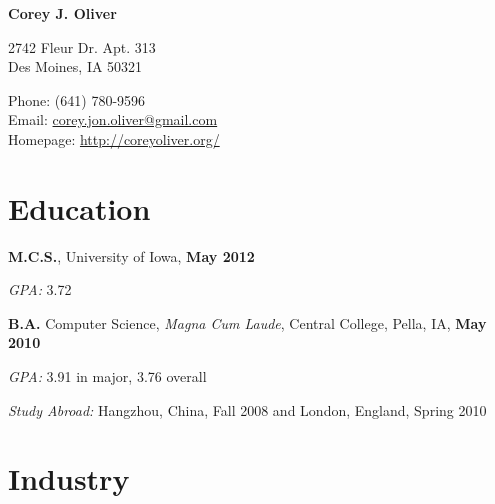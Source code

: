 \documentclass[10pt,letterpaper]{article}
\def\name{Corey J. Oliver}
\renewenvironment{itemize}{
  \begin{list}{}{
      \setlength{\leftmargin}{1.5em}
      \setlength{\itemsep}{0.25em}
      \setlength{\parskip}{0pt}
      \setlength{\parsep}{0.25em}
    }
  }{
  \end{list}
}
\begin{document}

\centerline{\huge \bf \name}

\bigskip

\begin{minipage}[t]{0.5\textwidth}
  2742 Fleur Dr. Apt. 313 \\
  Des Moines, IA 50321
\end{minipage}
\begin{minipage}[t]{0.5\textwidth}
  Phone: (641) 780-9596 \\
  Email: \href{mailto:corey.jon.oliver@gmail.com}{corey.jon.oliver@gmail.com} \\
  Homepage: \href{http://coreyoliver.org/}{http://coreyoliver.org/}
\end{minipage}

\section*{Education}

\begin{itemize}
\item \textbf{M.C.S.}, University of Iowa, \hfill \textbf{May 2012}
  \begin{itemize}
  \item \textit{GPA:}
    3.72
  \end{itemize}
\item \textbf{B.A.} Computer Science, \textit{Magna Cum Laude}, Central
  College, Pella, IA, \hfill \textbf{May 2010}
  \begin{itemize}
  \item \textit{GPA:}
    3.91 in major, 3.76 overall
  \item \textit{Study Abroad:} Hangzhou, China, Fall 2008 and
    London, England, Spring 2010
  \end{itemize}
\end{itemize}

\section*{Industry}
\end{document}
